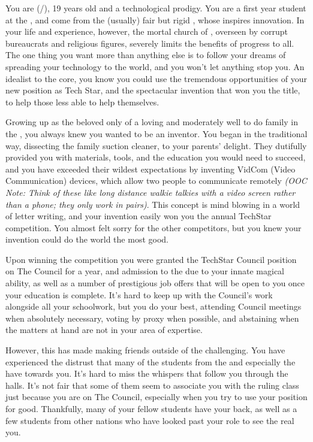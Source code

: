 \documentclass[char]{GL2020}
\begin{document}
You are \cTechStar{\full} (\cTechStar{\they}/\cTechStar{\them}), 19 years old and a technological prodigy. You are a first year student at the \pSchool{}, and come from the (usually) fair but rigid \pTech{}, whose \cTechGod{\Deity} \cTechGod{} inspires innovation. In your life and experience, however, the mortal church of \cTechGod{}, overseen by corrupt bureaucrats and religious figures, severely limits the benefits of progress to all. The one thing you want more than anything else is to follow your dreams of spreading your technology to the world, and you won't let anything stop you. An idealist to the core, you know you could use the tremendous opportunities of your new position as Tech Star, and the spectacular invention that won you the title, to help those less able to help themselves.

Growing up as the beloved only \cTechStar{\offspring} of a loving and moderately well to do family in the \pTech{}, you always knew you wanted to be an inventor. You began in the traditional way, dissecting the family suction cleaner, to your parents' delight. They dutifully provided you with materials, tools, and the education you would need to succeed, and you have exceeded their wildest expectations by inventing VidCom (Video Communication) devices, which allow two people to communicate remotely \emph{(OOC Note: Think of these like long distance walkie talkies with a video screen rather than a phone; they only work in pairs)}. This concept is mind blowing in a world of letter writing, and your invention easily won you the annual TechStar competition. You almost felt sorry for the other competitors, but you knew your invention could do the world the most good.  

Upon winning the competition you were granted the TechStar Council position on The Council for a year, and admission to the \pSchool{} due to your innate magical ability, as well as a number of prestigious job offers that will be open to you once your education is complete. It's hard to keep up with the Council's work alongside all your schoolwork, but you do your best, attending Council meetings when absolutely necessary, voting by proxy when possible, and abstaining when the matters at hand are not in your area of expertise.

However, this has made making friends outside of the \pTech{} challenging. You have experienced the distrust that many of the students from the \pFarm{} and especially the \pShip{} have towards you. It’s hard to miss the whispers that follow you through the halls. It’s not fair that some of them seem to associate you with the ruling class just because you are on The Council, especially when you try to use your position for good. Thankfully, many of your fellow \pTech{} students have your back, as well as a few students from other nations who have looked past your role to see the real you.
\end{document}
